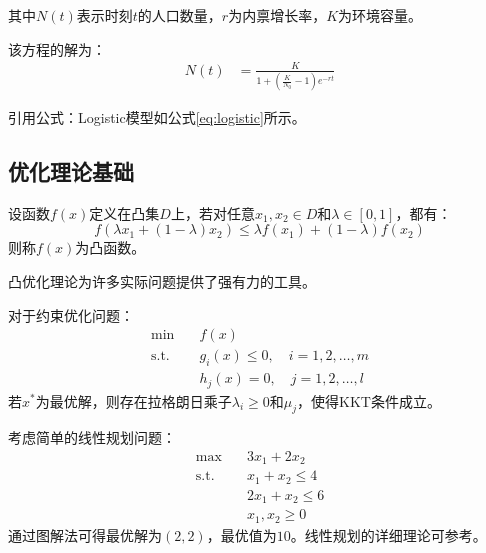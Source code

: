 \documentclass[../main]{subfiles}
\begin{document}
其中$N(t)$表示时刻$t$的人口数量，$r$为内禀增长率，$K$为环境容量。

该方程的解为：
\begin{align}
    N(t) &= \frac{K}{1 + \left(\frac{K}{N_0} - 1\right)e^{-rt}} \label{eq:logistic_solution}
\end{align}

引用公式：Logistic模型如公式\cref{eq:logistic}所示。

\subsection{优化理论基础}

\begin{definition}[凸函数]
设函数$f(x)$定义在凸集$D$上，若对任意$x_1, x_2 \in D$和$\lambda \in [0,1]$，都有：
$$f(\lambda x_1 + (1-\lambda)x_2) \leq \lambda f(x_1) + (1-\lambda)f(x_2)$$
则称$f(x)$为凸函数。
\end{definition}

凸优化理论为许多实际问题提供了强有力的工具\autocite{boyd2004convex}。

\begin{theorem}[KKT条件]
对于约束优化问题：
\begin{align}
    \min \quad & f(x) \\
    \text{s.t.} \quad & g_i(x) \leq 0, \quad i = 1,2,\ldots,m \\
    & h_j(x) = 0, \quad j = 1,2,\ldots,l
\end{align}
若$x^*$为最优解，则存在拉格朗日乘子$\lambda_i \geq 0$和$\mu_j$，使得KKT条件成立\autocite{karush1939minima}。
\end{theorem}

\begin{example}
考虑简单的线性规划问题：
\begin{align}
    \max \quad & 3x_1 + 2x_2 \\
    \text{s.t.} \quad & x_1 + x_2 \leq 4 \\
    & 2x_1 + x_2 \leq 6 \\
    & x_1, x_2 \geq 0
\end{align}
通过图解法可得最优解为$(2, 2)$，最优值为$10$。线性规划的详细理论可参考\textcite{luenberger2008linear}。
\end{example}
\end{document}
